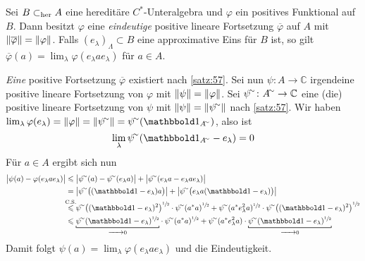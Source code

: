 \begin{satz}[{name=[Eindeutigkeit der Fortsetzung im hereditären Fall]},label=satz:58]
	Sei $B \subher A$ eine hereditäre $C^*$-Unteralgebra und $\varphi$ ein positives Funktional auf $B$. 
	Dann besitzt $\varphi$ eine \emph{eindeutige} positive lineare Fortsetzung $\overline{\varphi}$ auf $A$ mit $\norm*{\overline{\varphi}}=\norm*{\varphi}$.
	Falls $(e_\lambda)_\Lambda \subset B$ eine approximative Eins für $B$ ist, so gilt $\overline{\varphi}(a) = \lim_\lambda \varphi(e_\lambda a e_\lambda)$ für $a \in A$.
\end{satz}
\begin{beweis}
	\emph{Eine} positive Fortsetzung $\overline{\varphi}$ existiert nach \autoref{satz:57}. 
	Sei nun $\psi \colon A \to \mathbb{C}$ irgendeine positive lineare Fortsetzung von $\varphi$ mit $\norm*{\psi}=\norm*{\varphi}$.
	Sei $\psi^\simm \colon A^\simm \to \mathbb{C}$ eine (die) positive lineare Fortsetzung von $\psi$ mit $\norm*{\psi}=\norm*{\psi^\simm}$ nach \autoref{satz:57}.
	Wir haben $\lim_\lambda \varphi(e_\lambda)=\norm*{\varphi} = \norm*{\psi^\simm} = \psi^\simm(\ind_{A^\simm})$, also ist 
	\[
		\lim_\lambda \psi^\simm(\ind_{A^\simm} -e_\lambda)=0
	\]
	Für  $a \in A$ ergibt sich nun
	\begin{align}
		\abs[\big]{\psi(a)- \varphi(e_\lambda a e_\lambda)} &\le \abs[\big]{\psi^\simm(a)- \psi^\simm(e_\lambda a)} + \abs[\big]{ \psi^\simm \enbrace*{e_\lambda a - e_\lambda a e_\lambda}}\\
		&= \abs[\big]{\psi^\simm \enbrace[\big]{(\ind -e_\lambda)a}} + \abs[\big]{\psi^\simm \enbrace[\big]{e_\lambda a(\ind -e_\lambda)}} \\ 
		&\StackTextClap{C.S.}{\le} \psi^\simm \enbrace*{(\ind-e_\lambda)^2}^{\sfrac{1}{2}} \cdot \psi^\simm \enbrace*{a^*a}^{\sfrac{1}{2}} + \psi^\simm(a^* e_\lambda^2 a)^{\sfrac{1}{2}} \cdot \psi^\simm \enbrace*{(\ind-e_\lambda)^2}^{\sfrac{1}{2}} \\
		&\le \Underbracket{\psi^\simm (\ind-e_\lambda)^{\sfrac{1}{2}}}{\grenzw{} 0}\cdot  \psi^\simm (a^*a)^{\sfrac{1}{2}} + \psi^\simm (a^*e_\lambda^2 a) \cdot  \Underbracket{\psi^\simm(\ind-e_\lambda)^{\sfrac{1}{2}}}{\grenzw{} 0}
	\end{align}
	Damit folgt $\psi(a) = \lim_\lambda \varphi(e_\lambda a e_\lambda)$ und die Eindeutigkeit.
\end{beweis}

